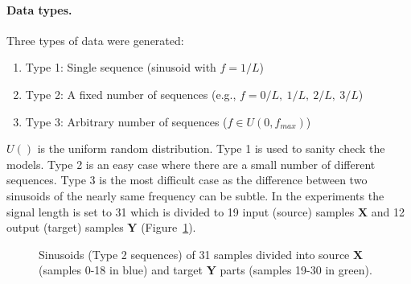 \documentclass[final]{article}
\begin{document}
\paragraph{Data types.} Three types of data were generated:
\begin{enumerate}
\item Type 1: Single sequence (sinusoid with $f=1/L$)
\item Type 2: A fixed number of sequences (e.g., $f=0/L,~1/L,~2/L,~3/L$)
\item Type 3: Arbitrary number of sequences ($f \in U(0,f_{max})$)
\end{enumerate}
$U()$ is the uniform random distribution. Type 1 is used to sanity check the models. Type 2 is an easy case where there are a small number of different sequences. Type 3 is the most difficult case as the difference between two sinusoids of the nearly same frequency can be subtle.
In the experiments the signal length is set to 31 which is divided to 19 input (source) samples $\mathbf{X}$ and 12 output (target) samples $\mathbf{Y}$ (Figure~\ref{fig:type2_data}).

\begin{figure}[h]
  \centering
  \caption{Sinusoids (Type 2 sequences) of 31 samples divided into source $\mathbf{X}$ (samples 0-18 in blue) and target $\mathbf{Y}$  parts (samples 19-30 in green).\label{fig:type2_data}}
\end{figure}
\end{document}
